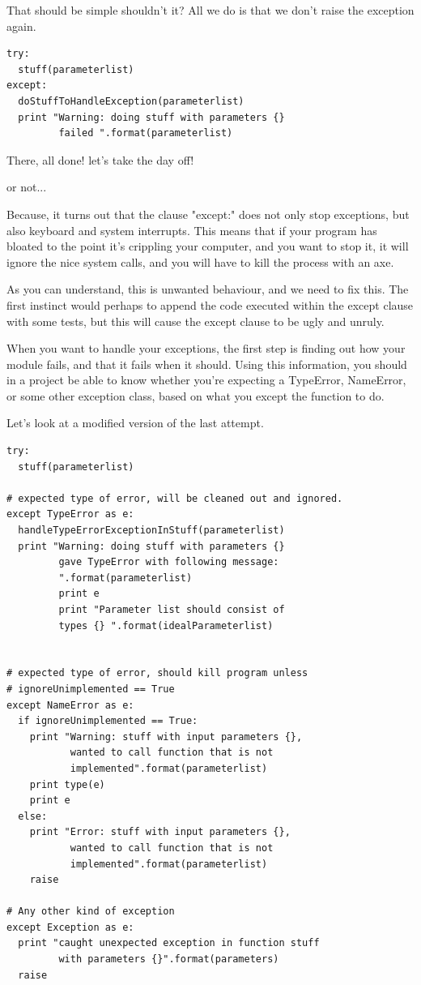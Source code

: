 \documentclass[10pt,a4paper]{article}
\begin{document}
That should be simple shouldn't it? All we do is that we don't raise the exception again.

\begin{lstlisting}
try: 
  stuff(parameterlist)
except:
  doStuffToHandleException(parameterlist)
  print "Warning: doing stuff with parameters {} 
         failed ".format(parameterlist) 
\end{lstlisting}

There, all done! let's take the day off!

or not...

Because, it turns out that the clause "except:" does 
not only stop exceptions, but also keyboard and system interrupts. 
This means that if your program has bloated to the point it's crippling your computer, and you want to stop it, it will ignore the nice system calls, and you will have to kill the process with an axe.

As you can understand, this is unwanted behaviour, and we need to fix this. The first instinct would perhaps to append the code executed within the except clause with some tests, but this will cause the except clause to be ugly and unruly.

When you want to handle your exceptions, the first step is finding out how your module fails, and that it fails when it should. Using this information, you should in a project be able to know whether you're expecting a TypeError, NameError, or some other exception class, based on what you except the function to do. 

Let's look at a modified version of the last attempt.

\begin{lstlisting}
try: 
  stuff(parameterlist)
  
# expected type of error, will be cleaned out and ignored.
except TypeError as e:
  handleTypeErrorExceptionInStuff(parameterlist)
  print "Warning: doing stuff with parameters {} 
         gave TypeError with following message:
         ".format(parameterlist)
         print e 
         print "Parameter list should consist of 
         types {} ".format(idealParameterlist)


# expected type of error, should kill program unless 
# ignoreUnimplemented == True
except NameError as e: 
  if ignoreUnimplemented == True:
    print "Warning: stuff with input parameters {}, 
           wanted to call function that is not 
           implemented".format(parameterlist)
    print type(e)
    print e
  else:
    print "Error: stuff with input parameters {}, 
           wanted to call function that is not 
           implemented".format(parameterlist)  
    raise

# Any other kind of exception
except Exception as e:
  print "caught unexpected exception in function stuff
         with parameters {}".format(parameters)
  raise
  
\end{lstlisting}
\end{document}
